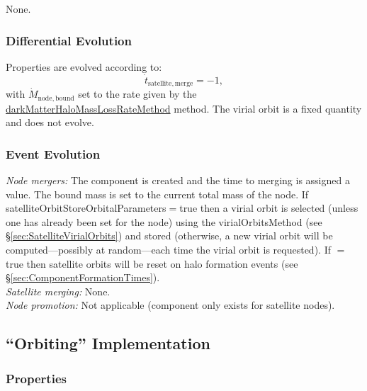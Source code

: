 None.

\subsubsection{Differential Evolution}

Properties are evolved according to:
\begin{equation}
 \dot{t}_\mathrm{satellite, merge} = -1,
\end{equation}
with $\dot{M}_\mathrm{node,bound}$ set to the rate given by the \href{https://github.com/galacticusorg/galacticus/releases/download/masterRelease/Galacticus_Development.pdf\#methods.darkMatterHaloMassLossRate}{\normalfont \ttfamily darkMatterHaloMassLossRateMethod} method. The virial orbit is a fixed quantity and does not evolve.

\subsubsection{Event Evolution}

\noindent\emph{Node mergers:} The \gls{component} is created and the time to merging is assigned a value. The bound mass is set to the current total mass of the node. If {\normalfont \ttfamily satelliteOrbitStoreOrbitalParameters}$=${\normalfont \ttfamily true} then a virial orbit is selected (unless one has already been set for the node) using the {\normalfont \ttfamily virialOrbitsMethod} (see \S\ref{sec:SatelliteVirialOrbits}) and stored (otherwise, a new virial orbit will be computed---possibly at random---each time the virial orbit is requested). If {\normalfont \ttfamily [satelliteOrbitResetOnHaloFormation]}$=${\normalfont \ttfamily true} then satellite orbits will be reset on halo formation events (see \S\ref{sec:ComponentFormationTimes}).\\

\noindent\emph{Satellite merging:} None.\\

\noindent\emph{Node promotion:} Not applicable (component only exists for satellite nodes).\\

\subsection{``Orbiting'' Implementation}\label{sec:ComponentSatelliteOrbiting}

\subsubsection{Properties}


